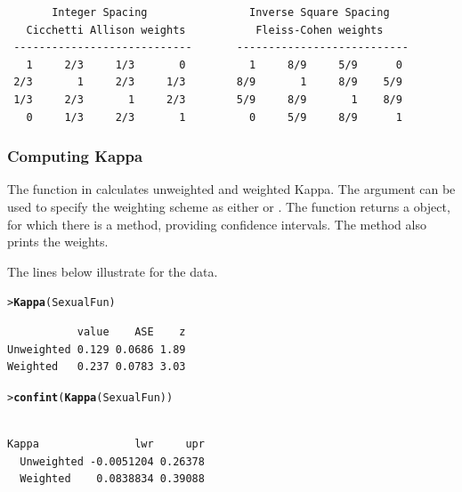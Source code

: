 \documentclass[10pt,krantz2]{krantz}\usepackage[]{graphicx}\usepackage[]{color}
\makeatletter
\newcommand{\hlstd}[1]{\textcolor[rgb]{0.345,0.345,0.345}{#1}}%
\newcommand{\hlkwd}[1]{\textcolor[rgb]{0.737,0.353,0.396}{\textbf{#1}}}%
\newenvironment{kframe}{%
 \def\at@end@of@kframe{}%
 \ifinner\ifhmode%
  \def\at@end@of@kframe{\end{minipage}}%
  \begin{minipage}{\columnwidth}%
 \fi\fi%
 \def\FrameCommand##1{\hskip\@totalleftmargin \hskip-\fboxsep
 \colorbox{shadecolor}{##1}\hskip-\fboxsep
     \hskip-\linewidth \hskip-\@totalleftmargin \hskip\columnwidth}%
 \MakeFramed {\advance\hsize-\width
   \@totalleftmargin\z@ \linewidth\hsize
   \@setminipage}}%
 {\par\unskip\endMakeFramed%
 \at@end@of@kframe}
\newenvironment{knitrout}{}{} %
\renewenvironment{knitrout}{\small\renewcommand{\baselinestretch}{.85}}{} %
\makeatother
\begin{document}
\begin{verbatim}
       Integer Spacing                Inverse Square Spacing
   Cicchetti Allison weights           Fleiss-Cohen weights
 ----------------------------       ---------------------------
   1     2/3     1/3       0          1     8/9     5/9      0
 2/3       1     2/3     1/3        8/9       1     8/9    5/9
 1/3     2/3       1     2/3        5/9     8/9       1    8/9
   0     1/3     2/3       1          0     5/9     8/9      1
\end{verbatim}

\subsubsection{Computing Kappa}

The function  in  calculates unweighted and weighted
Kappa.  The  argument can be used to specify the weighting
scheme as either  or .
The function returns a  object, for which there
is a  method, providing confidence intervals.
The  method also prints the weights.

The lines below illustrate  for the  data.
\begin{knitrout}
\color{fgcolor}\begin{kframe}
\begin{alltt}
\hlstd{> }\hlkwd{Kappa}\hlstd{(SexualFun)}
\end{alltt}
\begin{verbatim}
           value    ASE    z
Unweighted 0.129 0.0686 1.89
Weighted   0.237 0.0783 3.03
\end{verbatim}
\begin{alltt}
\hlstd{> }\hlkwd{confint}\hlstd{(}\hlkwd{Kappa}\hlstd{(SexualFun))}
\end{alltt}
\begin{verbatim}
            
Kappa               lwr     upr
  Unweighted -0.0051204 0.26378
  Weighted    0.0838834 0.39088
\end{verbatim}
\end{kframe}
\end{knitrout}

\end{document}
